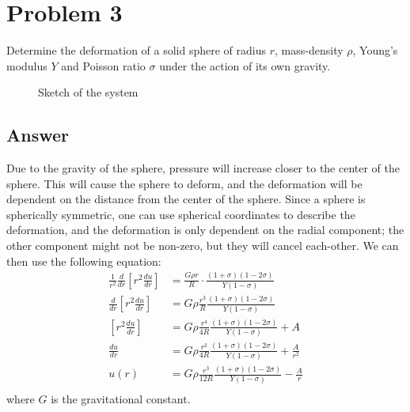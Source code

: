 \documentclass{article}
\begin{document}
\section*{Problem 3}
Determine the deformation of a solid sphere of radius $r$, mass-density $\rho$, Young's modulus $Y$ and Poisson ratio $\sigma$ under the action of its own gravity.
\begin{figure}[H]
    \centering
    \caption{Sketch of the system}
\end{figure}
\subsection*{Answer}
Due to the gravity of the sphere, pressure will increase closer to the center of the sphere. This will cause the sphere to deform, and the deformation will be dependent on the distance from the center of the sphere.
Since a sphere is spherically symmetric, one can use spherical coordinates to describe the deformation, and the deformation is only dependent on the radial component; the other component might not be non-zero, but they will cancel each-other.
We can then use the following equation:
\begin{align*}
    \frac{1}{r^2}\frac{d}{dr}\left[r^2\frac{du}{dr}\right] &= \frac{G\rho r}{R}\cdot\frac{(1+\sigma)(1-2\sigma)}{Y(1-\sigma)}\\
    \frac{d}{dr}\left[r^2\frac{du}{dr}\right] &= G\rho\frac{r^3}{R}\frac{(1+\sigma)(1-2\sigma)}{Y(1-\sigma)}\\
    \left[r^2\frac{du}{dr}\right] &= G\rho\frac{r^4}{4R}\frac{(1+\sigma)(1-2\sigma)}{Y(1-\sigma)}+ A\\
    \frac{du}{dr} &= G\rho\frac{r^2}{4R}\frac{(1+\sigma)(1-2\sigma)}{Y(1-\sigma)} + \frac{A}{r^2}\\
    u(r) &= G\rho\frac{r^3}{12R}\frac{(1+\sigma)(1-2\sigma)}{Y(1-\sigma)} - \frac{A}{r}\\
\end{align*}where $G$ is the gravitational constant.
\end{document}
